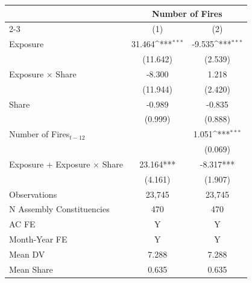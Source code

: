 {
\def\sym#1{\ifmmode^{#1}\else\(^{#1}\)\fi}
\begin{tabular}{l*{2}{c}}
\toprule
            &\multicolumn{2}{c}{Number of Fires}        \\\cmidrule(lr){2-3}
            &\multicolumn{1}{c}{(1)}         &\multicolumn{1}{c}{(2)}         \\
\midrule
Exposure    &      31.464\sym{***}&      -9.535\sym{***}\\
            &    (11.642)         &     (2.539)         \\
Exposure $\times$ Share&      -8.300         &       1.218         \\
            &    (11.944)         &     (2.420)         \\
Share       &      -0.989         &      -0.835         \\
            &     (0.999)         &     (0.888)         \\
Number of Fires$_{t-12}$&                     &       1.051\sym{***}\\
            &                     &     (0.069)         \\
\midrule
Exposure + Exposure $\times$ Share&   23.164***         &   -8.317***         \\
            &     (4.161)         &     (1.907)         \\
Observations&      23,745         &      23,745         \\
N Assembly Constituencies&         470         &         470         \\
AC FE       &           Y         &           Y         \\
Month-Year FE&           Y         &           Y         \\
Mean DV     &       7.288         &       7.288         \\
Mean Share  &       0.635         &       0.635         \\
\bottomrule
\end{tabular}
}
